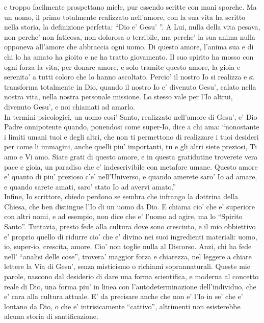 e troppo facilmente prospettano miele,
pur essendo scritte con mani sporche.
Ma un uomo, 
il primo totalmente realizzato nell'amore,
con la sua vita ha scritto nella storia,
la definizione perfetta: ``Dio e' Gesu' ''.
A Lui, nulla della vita pesava,
non perche' non faticosa, non dolorosa o terribile,
ma perche' la sua anima nulla opponeva
all'amore che abbraccia ogni uomo.
Di questo amore, l'anima sua e di chi lo ha amato
ha gioito e ne ha tratto giovamento.
Il suo spirito ha mosso con ogni forza la vita,
per donare amore, e solo tramite questo amore,
la gioia e serenita' a tutti coloro
che lo hanno ascoltato.
Percio' il nostro Io si realizza e si transforma totalmente in Dio, 
quando il nostro Io e' divenuto Gesu',
calato nella nostra vita,
nella nostra personale missione.
Lo stesso vale per l'Io altrui, divenuto Gesu',
e noi chiamati ad amarlo.
\\
In termini psicologici, un uomo cosi' Santo,
realizzato nell'amore di Gesu', e' Dio Padre onnipotente
quando, ponendosi come super-Io, dice a chi ama:
``nonostante i limiti umani tuoi e degli altri,
che non ti permettono di realizzare i tuoi desideri
per come li immagini, anche quelli piu' importanti,
tu e gli altri siete preziosi,
Ti amo e Vi amo.
Siate grati di questo amore,
e in questa gratidutine
troverete vera pace e gioia,
un paradiso che e' indescrivibile con metafore umane.
Questo amore e' quanto di piu' prezioso 
c'e' nell'Universo,
e quando amerete saro' Io ad amare,
e quando sarete amati, saro' stato Io ad avervi amato.''
\\
Infine, Io scrittore, chiedo perdono 
se sembra che infrango la dottrina della Chiesa,
che ben distingue l'Io di un uomo da Dio. 
E chiama cio' che e' superiore con altri nomi, 
e ad esempio, non dice  che e' l'uomo ad agire,
ma lo ``Spirito Santo''.
Tuttavia, presto fede alla cultura dove sono cresciuto,
e il mio obbiettivo e' proprio quello di ridurre 
cio' che e' divino nei suoi ingredienti materiali: 
uomo, io, super-io, crescita, amore. 
Cio' non toglie nulla al Discorso. Anzi,
chi ha fede nell' ``analisi delle cose'', trovera' 
maggior forza e chiarezza, nel leggere a chiare lettere
la Via di Gesu', senza misticismo o richiami soprannaturali.
Queste mie parole, nascono dal desiderio 
di dare una forma scientifica, e moderna 
al concetto reale di Dio,
una forma piu' in linea con l'autodeterminazione
dell'individuo, che e' cara alla cultura attuale.
E' da precisare anche che non e' l'Io in se'
che e' lontano da Dio, o che e' intrisicamente ``cattivo'',
altrimenti non esisterebbe alcuna storia di santificazione.
